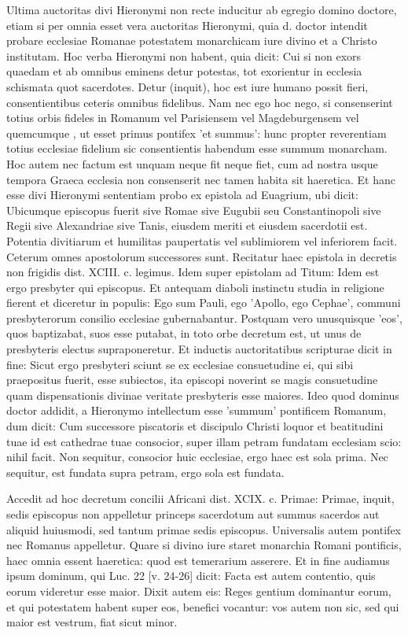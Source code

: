 Ultima auctoritas divi Hieronymi non recte inducitur ab egregio domino doctore, etiam si per omnia esset vera auctoritas Hieronymi, quia d. doctor intendit probare ecclesiae Romanae potestatem monarchicam iure divino et a Christo institutam. Hoc verba Hieronymi non habent, quia dicit: Cui si non exors quaedam et ab omnibus eminens detur potestas, tot exorientur in ecclesia schismata quot sacerdotes. Detur (inquit), hoc est iure humano possit fieri, consentientibus ceteris omnibus fidelibus. Nam nec ego hoc nego, si consenserint totius orbis fideles in Romanum vel Parisiensem vel Magdeburgensem vel quemcumque \marginpar{\small[259]}, ut esset primus pontifex 'et summus': hunc propter reverentiam totius ecclesiae fidelium sic consentientis habendum esse summum monarcham. Hoc autem nec factum est unquam neque fit neque fiet, cum ad nostra usque tempora Graeca ecclesia non consenserit nec tamen habita sit haeretica. Et hanc esse divi Hieronymi sententiam probo ex epistola ad Euagrium, ubi dicit: Ubicumque episcopus fuerit sive Romae sive Eugubii seu Constantinopoli sive Regii sive Alexandriae sive Tanis, eiusdem meriti et eiusdem sacerdotii est. Potentia divitiarum et humilitas paupertatis vel sublimiorem vel inferiorem facit. Ceterum omnes apostolorum successores sunt. Recitatur haec epistola in decretis non frigidis dist. XCIII. c. legimus. Idem super epistolam ad Titum: Idem est ergo presbyter qui episcopus. Et antequam diaboli instinctu studia in religione fierent et diceretur in populis: Ego sum Pauli, ego 'Apollo, ego Cephae', communi presbyterorum consilio ecclesiae gubernabantur. Postquam vero unusquisque 'eos', quos baptizabat, suos esse putabat, in toto orbe decretum est, ut unus de presbyteris electus supraponeretur. Et inductis auctoritatibus scripturae dicit in fine: Sicut ergo presbyteri sciunt se ex ecclesiae consuetudine ei, qui sibi praepositus fuerit, esse subiectos, ita episcopi noverint se magis consuetudine quam dispensationis divinae veritate presbyteris esse maiores. Ideo quod dominus doctor addidit, a Hieronymo intellectum esse 'summum' pontificem Romanum, dum dicit: Cum successore piscatoris et discipulo Christi loquor et beatitudini tuae id est cathedrae tuae consocior, super illam petram fundatam ecclesiam scio: nihil facit. Non sequitur, consocior huic ecclesiae, ergo haec est sola prima. Nec sequitur, est fundata supra petram, ergo sola est fundata.

Accedit ad hoc decretum concilii Africani dist. XCIX. c. Primae: Primae, inquit, sedis episcopus non appelletur princeps sacerdotum aut summus sacerdos aut aliquid huiusmodi, sed tantum primae sedis episcopus. Universalis autem pontifex nec Romanus appelletur. Quare si divino iure staret monarchia Romani pontificis, haec omnia essent haeretica: quod est temerarium asserere. Et in fine audiamus ipsum dominum, qui Luc. 22 [v. 24-26] dicit: Facta est autem contentio, quis eorum videretur esse maior. Dixit autem eis: Reges gentium dominantur eorum, et qui potestatem habent super eos, benefici vocantur: vos autem non sic, sed qui maior est vestrum, fiat sicut minor.

